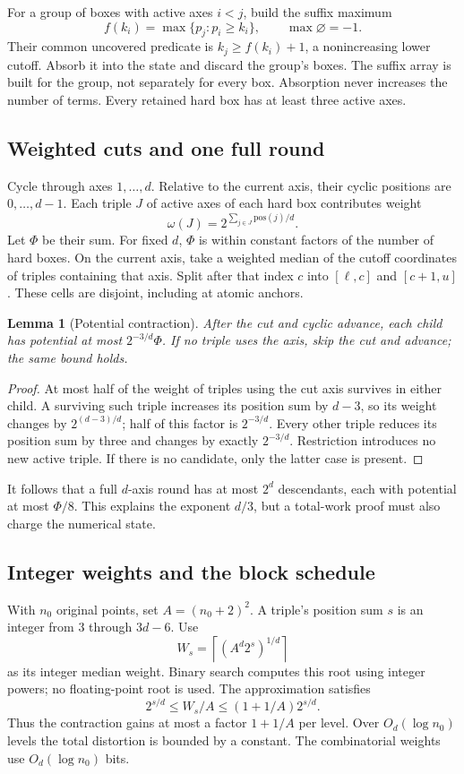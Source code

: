 \documentclass[12pt,a4paper]{article}
\newtheorem{lemma}[theorem]{Lemma}
\newcommand{\1}{\mathbf1}
\begin{document}
For a group of boxes with active axes $i<j$, build the suffix maximum
\[
f(k_i)=\max\{p_j:p_i\ge k_i\},\qquad\max\varnothing=-1.
\]
Their common uncovered predicate is $k_j\ge f(k_i)+1$, a nonincreasing
lower cutoff. Absorb it into the state and discard the group's boxes.
The suffix array is built for the group, not separately for every box.
Absorption never increases the number of terms. Every retained hard box
has at least three active axes.

\subsection{Weighted cuts and one full round}
Cycle through axes $1,\ldots,d$. Relative to the current axis, their
cyclic positions are $0,\ldots,d-1$. Each triple $J$ of active axes of
each hard box contributes weight
\[
                            \omega(J)=2^{\sum_{j\in J}\mathrm{pos}(j)/d}.
\]
Let $\Phi$ be their sum. For fixed $d$, $\Phi$ is within constant factors
of the number of hard boxes. On the current axis, take a weighted median
of the cutoff coordinates of triples containing that axis.
Split after that index $c$ into $[\ell,c]$ and $[c+1,u]$.
These cells are disjoint, including at atomic anchors.

\begin{lemma}[Potential contraction]
After the cut and cyclic advance, each child has potential at most
$2^{-3/d}\Phi$. If no triple uses the axis, skip the cut and advance;
the same bound holds.
\end{lemma}
\begin{proof}
At most half of the weight of triples using the cut axis survives in
either child. A surviving such triple increases its position sum by
$d-3$, so its weight changes by $2^{(d-3)/d}$; half of this factor is
$2^{-3/d}$. Every other triple reduces its position sum by three and
changes by exactly $2^{-3/d}$. Restriction introduces no new active triple.
If there is no candidate, only the latter case is present.
\end{proof}
It follows that a full $d$-axis round has at most $2^d$ descendants,
each with potential at most $\Phi/8$. This explains the exponent $d/3$,
but a total-work proof must also charge the numerical state.

\subsection{Integer weights and the block schedule}
With $n_0$ original points, set $A=(n_0+2)^2$. A triple's position sum
$s$ is an integer from $3$ through $3d-6$. Use
\[
                     W_s=\left\lceil(A^d2^s)^{1/d}\right\rceil
\]
as its integer median weight. Binary search computes this root using
integer powers; no floating-point root is used. The approximation satisfies
\[
        2^{s/d}\le W_s/A\le(1+1/A)2^{s/d}.
\]
Thus the contraction gains at most a factor $1+1/A$ per level. Over
$O_d(\log n_0)$ levels the total distortion is bounded by a constant.
The combinatorial weights use $O_d(\log n_0)$ bits.
\end{document}
